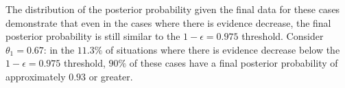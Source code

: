 \documentclass[12pt]{article}
\begin{document}
The distribution of the posterior probability given the final data for these cases demonstrate that even in the cases where there is evidence decrease, the final posterior probability is still similar to the $1-\epsilon=0.975$ threshold.
%
Consider $\theta_1=0.67$: in the $11.3\%$ of situations where there is evidence decrease below the $1-\epsilon=0.975$ threshold, $90\%$ of these cases have a final posterior probability of approximately $0.93$ or greater. 
%
%
%
\end{document}
